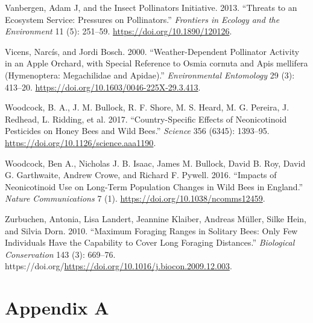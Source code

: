 \documentclass[smallextended]{svjour3}       %
\newlength{\cslhangindent}
\newenvironment{CSLReferences}[2] %
 {%
  \setlength{\parindent}{0pt}
  \ifodd #1 \everypar{\setlength{\hangindent}{\cslhangindent}}\ignorespaces\fi
  \ifnum #2 > 0
  \setlength{\parskip}{#2\baselineskip}
  \fi
 }%
 {}
\begin{document}
\begin{CSLReferences}{1}{0}
\leavevmode{}%
Vanbergen, Adam J, and the Insect Pollinators Initiative. 2013.
{``Threats to an Ecosystem Service: Pressures on Pollinators.''}
\emph{Frontiers in Ecology and the Environment} 11 (5): 251--59.
\url{https://doi.org/10.1890/120126}.

\leavevmode{}%
Vicens, Narcís, and Jordi Bosch. 2000. {``{Weather-Dependent Pollinator
Activity in an Apple Orchard, with Special Reference to Osmia cornuta
and Apis mellifera (Hymenoptera: Megachilidae and Apidae)}.''}
\emph{Environmental Entomology} 29 (3): 413--20.
\url{https://doi.org/10.1603/0046-225X-29.3.413}.

\leavevmode{}%
Woodcock, B. A., J. M. Bullock, R. F. Shore, M. S. Heard, M. G. Pereira,
J. Redhead, L. Ridding, et al. 2017. {``Country-Specific Effects of
Neonicotinoid Pesticides on Honey Bees and Wild Bees.''} \emph{Science}
356 (6345): 1393--95. \url{https://doi.org/10.1126/science.aaa1190}.

\leavevmode{}%
Woodcock, Ben A., Nicholas J. B. Isaac, James M. Bullock, David B. Roy,
David G. Garthwaite, Andrew Crowe, and Richard F. Pywell. 2016.
{``Impacts of Neonicotinoid Use on Long-Term Population Changes in Wild
Bees in {E}ngland.''} \emph{Nature Communications} 7 (1).
\url{https://doi.org/10.1038/ncomms12459}.

\leavevmode{}%
Zurbuchen, Antonia, Lisa Landert, Jeannine Klaiber, Andreas Müller,
Silke Hein, and Silvia Dorn. 2010. {``Maximum Foraging Ranges in
Solitary Bees: Only Few Individuals Have the Capability to Cover Long
Foraging Distances.''} \emph{Biological Conservation} 143 (3): 669--76.
https://doi.org/\url{https://doi.org/10.1016/j.biocon.2009.12.003}.

\end{CSLReferences}

\clearpage
\appendix
\setcounter{secnumdepth}{0}
\setcounter{figure}{0}
\setcounter{table}{0}
\renewcommand{\thetable}{A\arabic{table}}
\renewcommand{\thefigure}{A\arabic{figure}}

\hypertarget{appendix-a}{%
\section{Appendix A}\label{appendix-a}}
\end{document}
